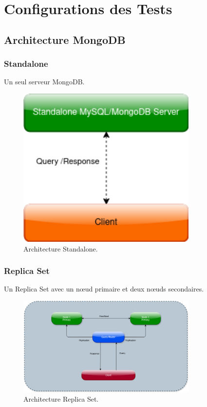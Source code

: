 \documentclass[a4paper,12pt]{report}
\begin{document}
\chapter{Configurations des Tests}

\section{Architecture MongoDB}

\subsection{Standalone}

Un seul serveur MongoDB.
\begin{figure}[H]
    \centering
    \includegraphics[width=0.8\textwidth]{architectures/Standalone.png}
    \caption{Architecture Standalone.}
    \label{fig:standalone}
\end{figure}

\subsection{Replica Set}

Un Replica Set avec un nœud primaire et deux nœuds secondaires.
\begin{figure}[H]
	\centering
	\includegraphics[width=0.8\textwidth]{architectures/MongoDBReplica.png}
	\caption{Architecture Replica Set.}
	\label{fig:mong-replica-set}
\end{figure}
\end{document}
